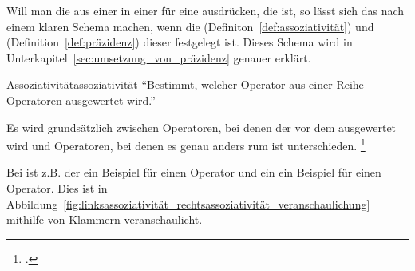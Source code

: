 Will man die  aus einer  in einer  für eine  ausdrücken, die   ist, so lässt sich das nach einem klaren Schema machen, wenn die  (Definiton~\ref{def:assoziativität}) und  (Definition~\ref{def:präzidenz}) dieser  festgelegt ist. Dieses Schema wird in Unterkapitel~\ref{sec:umsetzung_von_präzidenz} genauer erklärt.

\begin{Definition}{Assoziativität}{assoziativität}
  \enquote{Bestimmt, welcher Operator aus einer Reihe  Operatoren  ausgewertet wird.}

  Es wird grundsätzlich zwischen  Operatoren, bei denen der  vor dem  ausgewertet wird und  Operatoren, bei denen es genau anders rum ist unterschieden.
  \footcite{noauthor_parsing_nodate}
\end{Definition}

Bei  ist z.B. der  \smalltt{*} ein Beispiel für einen  Operator und ein  \smalltt{=} ein Beispiel für einen  Operator. Dies ist in Abbildung~\ref{fig:linksassoziativität_rechtsassoziativität_veranschaulichung} mithilfe von Klammern \smalltt{()} veranschaulicht.

